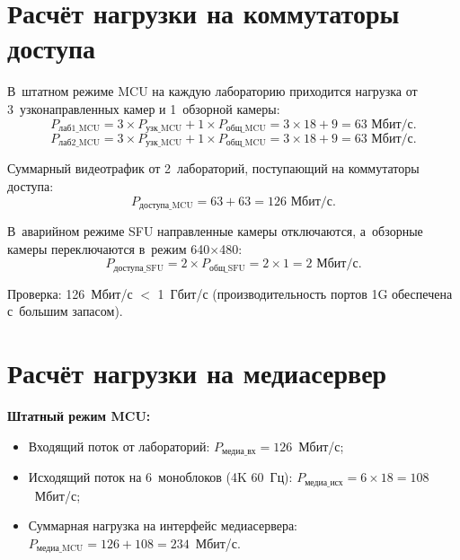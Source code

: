 \documentclass[a4paper,oneside,14pt]{extreport}
\begin{document}
\section{Расчёт нагрузки на коммутаторы доступа}

В~штатном режиме MCU на каждую лабораторию приходится нагрузка от 3~узконаправленных камер и 1~обзорной камеры:
\begin{equation}
    P_{\text{лаб1\_MCU}} = 3 \times P_{\text{узк\_MCU}} + 1 \times P_{\text{общ\_MCU}} = 3 \times 18 + 9 = 63 \text{ Мбит/с}.
    \label{eq:p_lab1}
\end{equation}
\begin{equation}
    P_{\text{лаб2\_MCU}} = 3 \times P_{\text{узк\_MCU}} + 1 \times P_{\text{общ\_MCU}} = 3 \times 18 + 9 = 63 \text{ Мбит/с}.
    \label{eq:p_lab2}
\end{equation}

Суммарный видеотрафик от 2~лабораторий, поступающий на коммутаторы доступа:
\begin{equation}
    P_{\text{доступа\_MCU}} = 63 + 63 = 126 \text{ Мбит/с}.
    \label{eq:p_access_mcu}
\end{equation}

В~аварийном режиме SFU направленные камеры отключаются, а~обзорные камеры переключаются в~режим 640$\times$480:
\begin{equation}
    P_{\text{доступа\_SFU}} = 2 \times P_{\text{общ\_SFU}} = 2 \times 1 = 2 \text{ Мбит/с}.
    \label{eq:p_access_sfu}
\end{equation}

Проверка: 126~Мбит/с $<$ 1~Гбит/с (производительность портов 1G обеспечена с~большим запасом).

\section{Расчёт нагрузки на медиасервер}

\textbf{Штатный режим MCU:}
\begin{itemize}
    \item Входящий поток от лабораторий: $P_{\text{медиа\_вх}} = 126$~Мбит/с;
    \item Исходящий поток на 6~моноблоков (4K 60~Гц): $P_{\text{медиа\_исх}} = 6 \times 18 = 108$~Мбит/с;
    \item Суммарная нагрузка на интерфейс медиасервера: $P_{\text{медиа\_MCU}} = 126 + 108 = 234$~Мбит/с.
\end{itemize}
\end{document}
